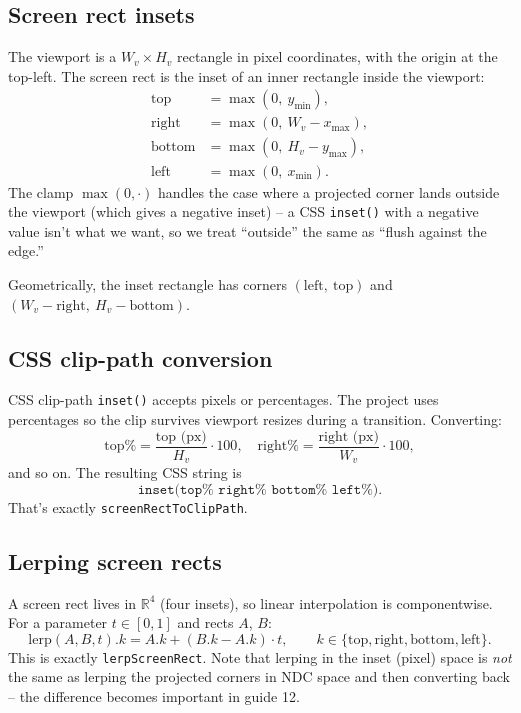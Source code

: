 \documentclass{article}
\begin{document}
\subsection{Screen rect insets}

The viewport is a $W_v \times H_v$ rectangle in pixel coordinates, with the origin at
the top-left. The screen rect is the inset of an inner rectangle inside the viewport:
\begin{align*}
  \text{top}    &= \max(0,\ y_{\min}), \\
  \text{right}  &= \max(0,\ W_v - x_{\max}), \\
  \text{bottom} &= \max(0,\ H_v - y_{\max}), \\
  \text{left}   &= \max(0,\ x_{\min}).
\end{align*}
The clamp $\max(0, \cdot)$ handles the case where a projected corner lands outside the
viewport (which gives a negative inset) -- a CSS \texttt{inset()} with a negative value
isn't what we want, so we treat ``outside'' the same as ``flush against the edge.''

Geometrically, the inset rectangle has corners
$(\text{left},\ \text{top})$ and $(W_v - \text{right},\ H_v - \text{bottom})$.

\subsection{CSS clip-path conversion}

CSS clip-path \texttt{inset()} accepts pixels or percentages. The project uses
percentages so the clip survives viewport resizes during a transition. Converting:
\[
  \text{top}\% = \frac{\text{top (px)}}{H_v} \cdot 100,
  \quad \text{right}\% = \frac{\text{right (px)}}{W_v} \cdot 100,
\]
and so on. The resulting CSS string is
\[
  \texttt{inset(top\%\ right\%\ bottom\%\ left\%)}.
\]
That's exactly \texttt{screenRectToClipPath}.

\subsection{Lerping screen rects}

A screen rect lives in $\mathbb{R}^4$ (four insets), so linear interpolation is
componentwise. For a parameter $t \in [0, 1]$ and rects $A$, $B$:
\[
  \mathrm{lerp}(A, B, t).k = A.k + (B.k - A.k) \cdot t,
  \qquad k \in \{\text{top}, \text{right}, \text{bottom}, \text{left}\}.
\]
This is exactly \texttt{lerpScreenRect}. Note that lerping in the inset (pixel) space is
\emph{not} the same as lerping the projected corners in NDC space and then converting
back -- the difference becomes important in guide 12.
\end{document}

